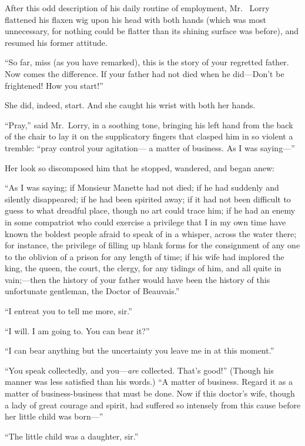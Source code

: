 After this odd description of his daily routine of employment, Mr.\ %
Lorry flattened his flaxen wig upon his head with both hands (which
was most unnecessary, for nothing could be flatter than its shining
surface was before), and resumed his former attitude.

``So far, miss (as you have remarked), this is the story of your
regretted father.  Now comes the difference.  If your father had not
died when he did---Don't be frightened!  How you start!''

She did, indeed, start.  And she caught his wrist with both her hands.

``Pray,'' said Mr.\ Lorry, in a soothing tone, bringing his left hand
from the back of the chair to lay it on the supplicatory fingers that
clasped him in so violent a tremble:  ``pray control your agitation---%
a matter of business.  As I was saying---''

Her look so discomposed him that he stopped, wandered, and began anew:

``As I was saying; if Monsieur Manette had not died; if he had
suddenly and silently disappeared; if he had been spirited away;
if it had not been difficult to guess to what dreadful place, though
no art could trace him; if he had an enemy in some compatriot who
could exercise a privilege that I in my own time have known the boldest
people afraid to speak of in a whisper, across the water there; for
instance, the privilege of filling up blank forms for the consignment
of any one to the oblivion of a prison for any length of time; if his
wife had implored the king, the queen, the court, the clergy, for any
tidings of him, and all quite in vain;---then the history of your father
would have been the history of this unfortunate gentleman, the Doctor
of Beauvais.''

``I entreat you to tell me more, sir.''

``I will.  I am going to.  You can bear it?''

``I can bear anything but the uncertainty you leave me in at this moment.''

``You speak collectedly, and you---\emph{are} collected.  That's good!''
(Though his manner was less satisfied than his words.) ``A matter of
business.  Regard it as a matter of business-business that must be
done.  Now if this doctor's wife, though a lady of great courage and
spirit, had suffered so intensely from this cause before her little
child was born---''

``The little child was a daughter, sir.''

